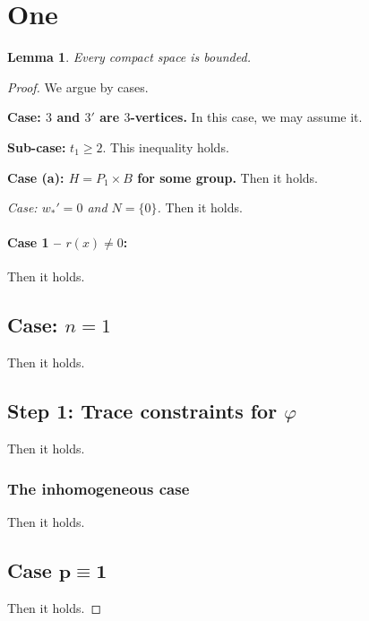 \documentclass{article}
\newtheorem{lemma}{Lemma}
\begin{document}
\section{One}
\begin{lemma} Every compact space is bounded. \end{lemma}
\begin{proof}
We argue by cases.

{\bf Case: $3$ and $3'$ are $3$-vertices.}  In this case, we may assume it.

{\bf Sub-case:} $t_1\geq 2$. This inequality holds.

{\bf{Case (a): \; $H=P_1\times B$ for some group.}} Then it holds.

\textit{Case: $w_{*}' = 0$ and $N = \{0\}$.} Then it holds.

\paragraph{Case 1 -- $r(x)\neq 0$:} Then it holds.

\subsection*{Case: $n=1$}
Then it holds.

\subsection*{\texorpdfstring{Step 1: Trace constraints for $\varphi$}{Step 1}}
Then it holds.

\subsubsection{The inhomogeneous case}
Then it holds.

\subsection[Case $p\equiv 1$]{Case $\boldsymbol{p\equiv 1}$}
Then it holds.
\end{proof}
\end{document}
